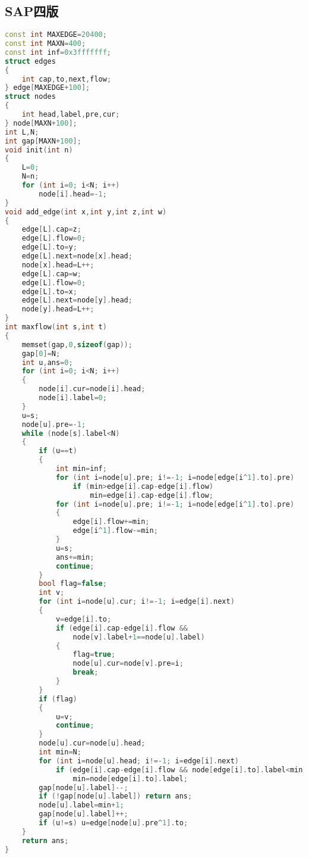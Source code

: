 \subsection{SAP四版}
	\begin{lstlisting}[language=c++]
const int MAXEDGE=20400;
const int MAXN=400;
const int inf=0x3fffffff;
struct edges
{
	int cap,to,next,flow;
} edge[MAXEDGE+100];
struct nodes
{
	int head,label,pre,cur;
} node[MAXN+100];
int L,N;
int gap[MAXN+100];
void init(int n)
{
	L=0;
	N=n;
	for (int i=0; i<N; i++)
		node[i].head=-1;
}
void add_edge(int x,int y,int z,int w)
{
	edge[L].cap=z;
	edge[L].flow=0;
	edge[L].to=y;
	edge[L].next=node[x].head;
	node[x].head=L++;
	edge[L].cap=w;
	edge[L].flow=0;
	edge[L].to=x;
	edge[L].next=node[y].head;
	node[y].head=L++;
}
int maxflow(int s,int t)
{
	memset(gap,0,sizeof(gap));
	gap[0]=N;
	int u,ans=0;
	for (int i=0; i<N; i++)
	{
		node[i].cur=node[i].head;
		node[i].label=0;
	}
	u=s;
	node[u].pre=-1;
	while (node[s].label<N)
	{
		if (u==t)
		{
			int min=inf;
			for (int i=node[u].pre; i!=-1; i=node[edge[i^1].to].pre)
				if (min>edge[i].cap-edge[i].flow)
					min=edge[i].cap-edge[i].flow;
			for (int i=node[u].pre; i!=-1; i=node[edge[i^1].to].pre)
			{
				edge[i].flow+=min;
				edge[i^1].flow-=min;
			}
			u=s;
			ans+=min;
			continue;
		}
		bool flag=false;
		int v;
		for (int i=node[u].cur; i!=-1; i=edge[i].next)
		{
			v=edge[i].to;
			if (edge[i].cap-edge[i].flow &&
				node[v].label+1==node[u].label)
			{
				flag=true;
				node[u].cur=node[v].pre=i;
				break;
			}
		}
		if (flag)
		{
			u=v;
			continue;
		}
		node[u].cur=node[u].head;
		int min=N;
		for (int i=node[u].head; i!=-1; i=edge[i].next)
			if (edge[i].cap-edge[i].flow && node[edge[i].to].label<min)
				min=node[edge[i].to].label;
		gap[node[u].label]--;
		if (!gap[node[u].label]) return ans;
		node[u].label=min+1;
		gap[node[u].label]++;
		if (u!=s) u=edge[node[u].pre^1].to;
	}
	return ans;
}
	\end{lstlisting}